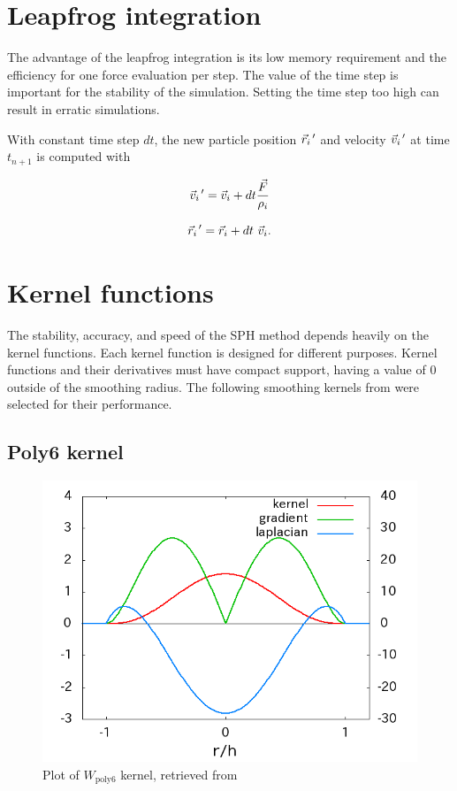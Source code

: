 \documentclass[a4paper, 12pt, oneside]{book}
\begin{document}
\section{Leapfrog integration}

\begin{doublespace}
    The advantage of the leapfrog integration is its low memory requirement and the efficiency for one force evaluation per step. The value of the time step is important for the stability of the simulation. Setting the time step too high can result in erratic simulations.
    
    With constant time step \(dt\), the new particle position \(\vec{r}_{i}\mkern2mu\vphantom{r}'\) and velocity \(\vec{v}_{i}\mkern2mu\vphantom{v}'\) at time \(t_{n+1}\) is computed with
    
    \begin{equation}
        \vec{v}_{i}\mkern2mu\vphantom{v}' = \vec{v}_{i} + dt \frac{ \vec{F} } { \rho_{i}}
    \end{equation}
    
    \begin{equation}
        \vec{r}_{i}\mkern2mu\vphantom{r}' = \vec{r}_{i} + dt \ \vec{v}_{i} .
    \end{equation}
\end{doublespace}

\section{Kernel functions}
\begin{doublespace}
     The stability, accuracy, and speed of the SPH method depends heavily on the kernel functions. Each kernel function is designed for different purposes. Kernel functions and their derivatives must have compact support, having a value of 0 outside of the smoothing radius. The following smoothing kernels from \cite{muller2003} were selected for their performance.
\end{doublespace}

\subsection{Poly6 kernel}

\begin{figure}[H]
    \centering
    \includegraphics[width=0.6\linewidth]{images/kernel_poly6.png}
    \caption{Plot of \(W_{\mathrm{poly6}}\) kernel, retrieved from \cite{web:pukiwiki_kernel_functions}} 
\end{figure}
\end{document}
